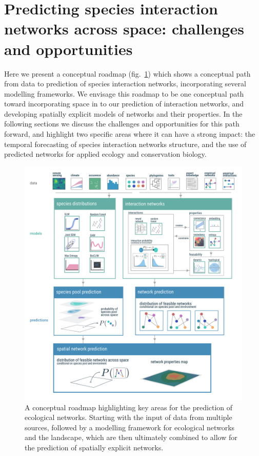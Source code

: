 \documentclass[10pt,oneside]{article}
\makeatletter
\def\maxwidth{\ifdim\Gin@nat@width>\linewidth\linewidth
\else\Gin@nat@width\fi}
\let\Oldincludegraphics\includegraphics
\renewcommand{\includegraphics}[1]{\Oldincludegraphics[width=\maxwidth]{#1}}
\makeatother
\begin{document}
\hypertarget{predicting-species-interaction-networks-across-space-challenges-and-opportunities}{%
\section{Predicting species interaction networks across space:
challenges and
opportunities}\label{predicting-species-interaction-networks-across-space-challenges-and-opportunities}}

Here we present a conceptual roadmap (fig.~\ref{fig:conceptual}) which
shows a conceptual path from data to prediction of species interaction
networks, incorporating several modelling frameworks. We envisage this
roadmap to be one conceptual path toward incorporating space in to our
prediction of interaction networks, and developing spatially explicit
models of networks and their properties. In the following sections we
discuss the challenges and opportunities for this path forward, and
highlight two specific areas where it can have a strong impact: the
temporal forecasting of species interaction networks structure, and the
use of predicted networks for applied ecology and conservation biology.

\begin{figure}
\hypertarget{fig:conceptual}{%
\centering
\includegraphics{figures/concept_v6.png}
\caption{A conceptual roadmap highlighting key areas for the prediction
of ecological networks. Starting with the input of data from multiple
sources, followed by a modelling framework for ecological networks and
the landscape, which are then ultimately combined to allow for the
prediction of spatially explicit networks.}\label{fig:conceptual}
}
\end{figure}
\end{document}
